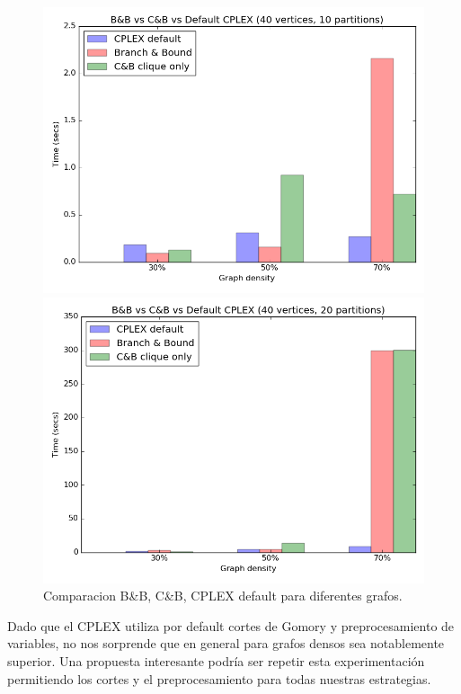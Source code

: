 \begin{figure}[h]
\begin{minipage}[b]{0.49\textwidth}
  \end{minipage}
  \begin{minipage}[b]{0.49\textwidth}
    \includegraphics[width=\textwidth]{img/8-compare_v40_p10_i1_l40_t1_b0.png}
  \end{minipage}
  \hfill
  \begin{minipage}[b]{0.49\textwidth}
    \includegraphics[width=\textwidth]{img/8-compare_v40_p20_i1_l40_t1_b0.png}
  \end{minipage}
	\caption{Comparacion B\&B, C\&B, CPLEX default para diferentes grafos.}
\end{figure}

Dado que el CPLEX utiliza por default cortes de Gomory y preprocesamiento de variables, no nos sorprende que en general para grafos densos sea notablemente superior. Una propuesta interesante podría ser repetir esta experimentación permitiendo los cortes y el preprocesamiento para todas nuestras estrategias.

